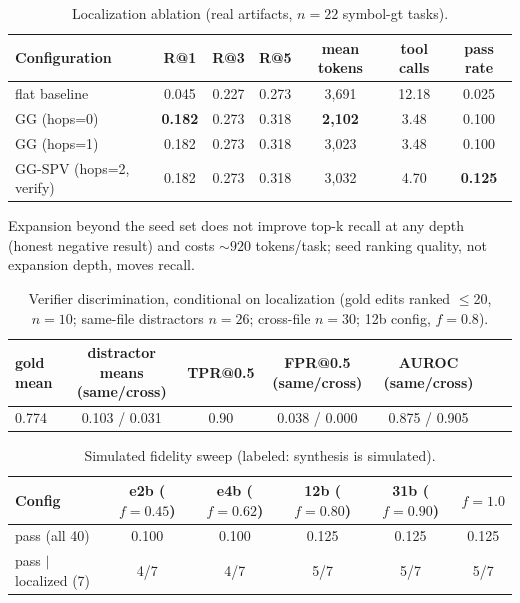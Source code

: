 \documentclass[10pt]{article}
\begin{document}
\begin{table}[h]\centering\small
\caption{Localization ablation (real artifacts, $n{=}22$ symbol-gt tasks).}\label{tab:loc}
\begin{tabular}{lcccccc}
\toprule
Configuration & R@1 & R@3 & R@5 & mean tokens & tool calls & pass rate\\
\midrule
flat baseline & 0.045 & 0.227 & 0.273 & 3{,}691 & 12.18 & 0.025\\
GG (hops=0) & \textbf{0.182} & 0.273 & 0.318 & \textbf{2{,}102} & 3.48 & 0.100\\
GG (hops=1) & 0.182 & 0.273 & 0.318 & 3{,}023 & 3.48 & 0.100\\
GG-SPV (hops=2, verify) & 0.182 & 0.273 & 0.318 & 3{,}032 & 4.70 & \textbf{0.125}\\
\bottomrule
\end{tabular}
\end{table}

Expansion beyond the seed set does not improve top-k recall at any depth (honest negative result) and costs ${\sim}920$ tokens/task; seed ranking quality, not expansion depth, moves recall.

\begin{table}[h]\centering\small
\caption{Verifier discrimination, conditional on localization (gold edits ranked $\le$20, $n{=}10$; same-file distractors $n{=}26$; cross-file $n{=}30$; 12b config, $f{=}0.8$).}\label{tab:ver}
\begin{tabular}{lcccccc}
\toprule
gold mean & distractor means (same/cross) & TPR@0.5 & FPR@0.5 (same/cross) & AUROC (same/cross)\\
\midrule
0.774 & 0.103 / 0.031 & 0.90 & 0.038 / 0.000 & 0.875 / 0.905\\
\bottomrule
\end{tabular}
\end{table}

\begin{table}[h]\centering\small
\caption{Simulated fidelity sweep (labeled: synthesis is simulated).}\label{tab:fid}
\begin{tabular}{lccccc}
\toprule
Config & e2b ($f{=}0.45$) & e4b ($f{=}0.62$) & 12b ($f{=}0.80$) & 31b ($f{=}0.90$) & $f{=}1.0$\\
\midrule
pass (all 40) & 0.100 & 0.100 & 0.125 & 0.125 & 0.125\\
pass $\mid$ localized (7) & 4/7 & 4/7 & 5/7 & 5/7 & 5/7\\
\bottomrule
\end{tabular}
\end{table}
\end{document}
